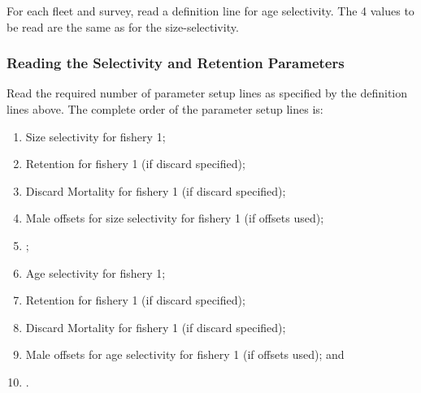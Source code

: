 For each fleet and survey, read a definition line for age selectivity. The 4 values to be read are the same as for the size-selectivity. 

\subsubsection{Reading the Selectivity and Retention Parameters}
Read the required number of parameter setup lines as specified by the definition lines above.  The complete order of the parameter setup lines is:
\begin{enumerate}
	\item Size selectivity for fishery 1;
	\item Retention for fishery 1 (if discard specified);
	\item Discard Mortality for fishery 1 (if discard specified);
	\item Male offsets for size selectivity for fishery 1 (if offsets used);
	\item <repeat for additional fleets and surveys>;
	\item Age selectivity for fishery 1;
	\item Retention for fishery 1 (if discard specified);
	\item Discard Mortality for fishery 1 (if discard specified);
	\item Male offsets for age selectivity for fishery 1 (if offsets used); and
	\item <repeat for additional fleets and surveys>.
\end{enumerate}


